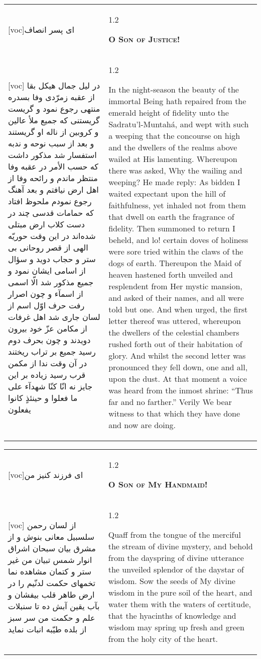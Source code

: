 \documentclass[11pt]{article}
\makeatletter
\newenvironment{orig}
  {\begin{farsi}[voc]}
  {\end{farsi}}
\newenvironment{trans}
  {\Large\begin{spacing}{1.2}\raggedright}
  {\end{spacing}}
\newenvironment{word}
  {\begin{tabular}[t]{p{2.75in}@{\hspace{3em}}p{2.75in}}}
  {\end{tabular}}
\newcommand{\ayat}[2]{\begin{orig}#1\end{orig} & \begin{trans}#2\end{trans}}
\newcommand{\heading}[2]{\textsc{\textbf{#1}} %
}
\makeatother
\begin{document}
\begin{word}
\ayat{ای پسر انصاف}{\heading{O Son of Justice!}{}} \\ \ayat{
در ليل جمال هيکل بقا از عقبه زمرّدی وفا بسدره منتهی رجوع نمود و گريست گريستنی که جميع ملأ عالين و کروبين از ناله او گريستند
و بعد از سبب نوحه و ندبه استفسار شد مذکور داشت که حسب الأمر در عقبه وفا منتظر ماندم و رائحه وفا از اهل ارض نيافتم و بعد آهنگ رجوع نمودم ملحوظ افتاد که حمامات قدسی چند در دست کلاب ارض مبتلی شده‌اند
در اين وقت حوريّه الهی از قصر روحانی بی ستر و حجاب دويد و سؤال از اسامی ايشان نمود و جميع مذکور شد الّا اسمی از اسمآء
و چون اصرار رفت حرف اوّل اسم از لسان جاری شد اهل غرفات از مکامن عزّ خود بيرون دويدند و چون بحرف دوم رسيد جميع بر تراب ريختند در آن وقت ندا از مکمن قرب رسيد زياده بر اين جايز نه انّا کنّا شهدآء علی ما فعلوا و حينئذٍ کانوا يفعلون
}{
  In the night-season the beauty of the immortal Being hath repaired from the
  emerald height of fidelity unto the Sadratu'l-Muntahá, and wept with such a
  weeping that the concourse on high and the dwellers of the realms above
  wailed at His lamenting. Whereupon there was asked, Why the wailing and
  weeping? He made reply: As bidden I waited expectant upon the hill of
  faithfulness, yet inhaled not from them that dwell on earth the fragrance of
  fidelity. Then summoned to return I beheld, and lo! certain doves of
  holiness were sore tried within the claws of the dogs of earth. Thereupon
  the Maid of heaven hastened forth unveiled and resplendent from Her mystic
  mansion, and asked of their names, and all were told but one. And when
  urged, the first letter thereof was uttered, whereupon the dwellers of the
  celestial chambers rushed forth out of their habitation of glory. And whilst
  the second letter was pronounced they fell down, one and all, upon the dust.
  At that moment a voice was heard from the inmost shrine: ``Thus far and no
  farther.'' Verily We bear witness to that which they have done and now are
  doing.
}
\end{word}

\pagebreak

\begin{word}
\ayat{ای فرزند کنيز من}{\heading{O Son of My Handmaid!}{}} \\ \ayat{
از لسان رحمن سلسبيل معانی بنوش و از مشرق بيان سبحان اشراق انوار شمس تبيان من غير ستر و کتمان مشاهده نما
تخمهای حکمت لدنّيم را در ارض طاهر قلب بيفشان و بآب يقين آبش ده تا سنبلات علم و حکمت من سر سبز از بلده طيّبه انبات نمايد
}{
  Quaff from the tongue of the merciful the stream of divine mystery, and
  behold from the dayspring of divine utterance the unveiled splendor of the
  daystar of wisdom. Sow the seeds of My divine wisdom in the pure soil of the
  heart, and water them with the waters of certitude, that the hyacinths of
  knowledge and wisdom may spring up fresh and green from the holy city of the
  heart.
}
\end{word}
\end{document}
